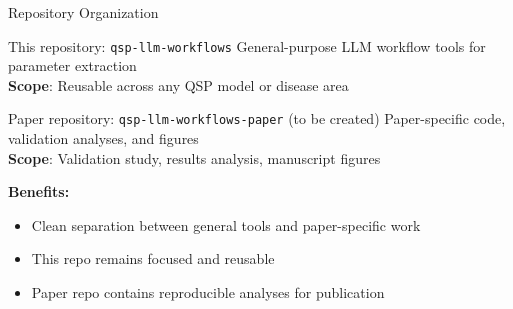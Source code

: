 \documentclass[10pt]{beamer}
\begin{document}
\begin{frame}{Repository Organization}

  \begin{block}{This repository: \texttt{qsp-llm-workflows}}
    General-purpose LLM workflow tools for parameter extraction\\
    \textbf{Scope}: Reusable across any QSP model or disease area
  \end{block}

  \vspace{0.3cm}

  \begin{block}{Paper repository: \texttt{qsp-llm-workflows-paper} (to be created)}
    Paper-specific code, validation analyses, and figures\\
    \textbf{Scope}: Validation study, results analysis, manuscript figures
  \end{block}

  \vspace{0.3cm}

  \textbf{Benefits:}
  \begin{itemize}
    \item Clean separation between general tools and paper-specific work
    \item This repo remains focused and reusable
    \item Paper repo contains reproducible analyses for publication
  \end{itemize}

\end{frame}
\end{document}
